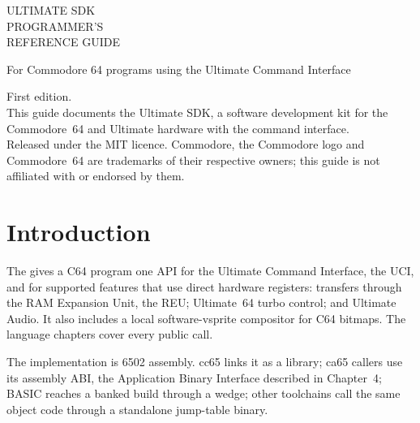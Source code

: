 \documentclass[10pt,openany]{book}
\newcommand{\evidence}[1]{}
\begin{document}
\thispagestyle{empty}
\AddToShipoutPictureBG*{\AtPageLowerLeft{%
  \color{guideblue}\rule{\paperwidth}{\paperheight}}}
\null\vspace*{0.20\paperheight}
{\color{white}\headingfont\centering
 {\fontsize{30}{34}\selectfont ULTIMATE SDK}\\[0.9\baselineskip]
 {\fontsize{20}{24}\selectfont PROGRAMMER'S}\\[0.25\baselineskip]
 {\fontsize{20}{24}\selectfont REFERENCE GUIDE}\par}
\vfill
{\color{white}\centering\normalfont\small
 For Commodore 64 programs using the Ultimate Command Interface\par}
\vspace{0.10\paperheight}
\clearpage

\thispagestyle{empty}
\null\vfill
\noindent\small
First edition.\\[0.4\baselineskip]
This guide documents the Ultimate SDK, a software development kit for the
Commodore~64 and Ultimate hardware with the command interface.\\[0.6\baselineskip]
Released under the MIT licence. Commodore, the Commodore logo and Commodore~64
are trademarks of their respective owners; this guide is not affiliated with or
endorsed by them.
\clearpage

\tableofcontents

\cleardoublepage
\section*{Introduction}

The \sdk{} gives a C64 program one API for the Ultimate Command Interface, the
UCI, and for supported features that use direct hardware registers: transfers
through the RAM Expansion Unit, the REU; Ultimate~64 turbo control; and
Ultimate Audio. It also includes a local software-vsprite compositor for C64
bitmaps. The language chapters cover every public call.

\evidence{\cmd{include/ultimate.h}; \cmd{include/uci.h};
\cmd{tools/test\_registers.py}}

The implementation is 6502 assembly. cc65 links it as a library; ca65 callers
use its assembly ABI, the Application Binary Interface described in
Chapter~4; BASIC reaches a banked build through a wedge; other toolchains
call the same object code through a standalone jump-table binary.
\end{document}

